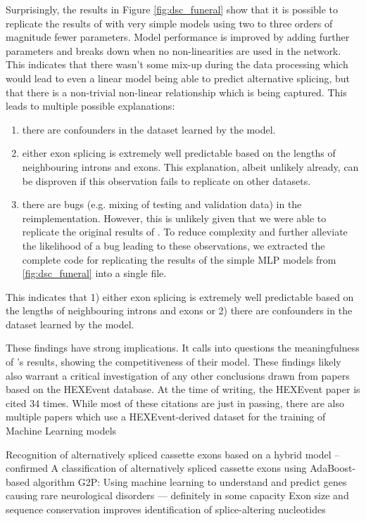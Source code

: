 Surprisingly, the results in Figure \ref{fig:dsc_funeral} show that it is possible to replicate the results of \cite{dsc} with very simple models using two to three orders of magnitude fewer parameters. Model performance is improved by adding further parameters and breaks down when no non-linearities are used in the network. This indicates that there wasn't some mix-up during the data processing which would lead to even a linear model being able to predict alternative splicing, but that there is a non-trivial non-linear relationship which is being captured.
This leads to multiple possible explanations:
\begin{enumerate}
	\item there are confounders in the dataset learned by the model.
	\item either exon splicing is extremely well predictable based on the lengths of neighbouring introns and exons. This explanation, albeit unlikely already, can be disproven if this observation fails to replicate on other datasets.
	\item there are bugs (e.g. mixing of testing and validation data) in the reimplementation. However, this is unlikely given that we were able to replicate the original results of \cite{dsc}. To reduce complexity and further alleviate the likelihood of a bug leading to these observations, we extracted the complete code for replicating the results of the simple MLP models from \ref{fig:dsc_funeral} into a single file. 
\end{enumerate}
This indicates that 1) either exon splicing is extremely well predictable based on the lengths of neighbouring introns and exons or 2) there are confounders in the dataset learned by the model. 

These findings have strong implications. It calls into questions the meaningfulness of \cite{dsc}'s results, showing the competitiveness of their model. These findings likely also warrant a critical investigation of any other conclusions drawn from papers based on the HEXEvent database. At the time of writing, the HEXEvent paper is cited 34 times. While most of these citations are just in passing, there are also multiple papers which use a HEXEvent-derived dataset for the training of Machine Learning models \cite{buschhertel} 

Recognition of alternatively spliced cassette exons based on a hybrid model -- confirmed
A classification of alternatively spliced cassette exons using AdaBoost-based algorithm
G2P: Using machine learning to understand and predict genes causing rare neurological disorders --- definitely in some capacity
Exon size and sequence conservation improves identification of splice-altering nucleotides

